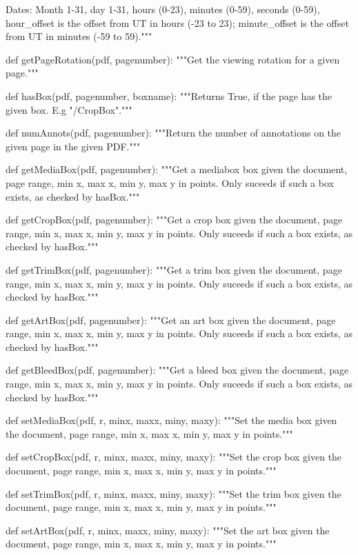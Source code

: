     Dates: Month 1-31, day 1-31, hours (0-23), minutes (0-59), seconds (0-59),
    hour_offset is the offset from UT in hours (-23 to 23); minute_offset is
    the offset from UT in minutes (-59 to 59)."""

def getPageRotation(pdf, pagenumber):
    """Get the viewing rotation for a given page."""

def hasBox(pdf, pagenumber, boxname):
    """Returns True, if the page has the given box. E.g "/CropBox"."""

def numAnnots(pdf, pagenumber):
    """Return the number of annotations on the given page in the given PDF."""

def getMediaBox(pdf, pagenumber):
    """Get a mediabox box given the document, page range, min x, max x, min y,
    max y in points. Only suceeds if such a box exists, as checked by
    hasBox."""

def getCropBox(pdf, pagenumber):
    """Get a crop box given the document, page range, min x, max x, min y, max
    y in points. Only suceeds if such a box exists, as checked by hasBox."""

def getTrimBox(pdf, pagenumber):
    """Get a trim box given the document, page range, min x, max x, min y, max
    y in points. Only suceeds if such a box exists, as checked by hasBox."""

def getArtBox(pdf, pagenumber):
    """Get an art box given the document, page range, min x, max x, min y, max
    y in points. Only suceeds if such a box exists, as checked by hasBox."""

def getBleedBox(pdf, pagenumber):
    """Get a bleed box given the document, page range, min x, max x, min y, max
    y in points. Only suceeds if such a box exists, as checked by hasBox."""

def setMediaBox(pdf, r, minx, maxx, miny, maxy):
    """Set the media box given the document, page range, min x, max x, min y,
    max y in points."""

def setCropBox(pdf, r, minx, maxx, miny, maxy):
    """Set the crop box given the document, page range, min x, max x, min y,
    max y in points."""

def setTrimBox(pdf, r, minx, maxx, miny, maxy):
    """Set the trim box given the document, page range, min x, max x, min y,
    max y in points."""

def setArtBox(pdf, r, minx, maxx, miny, maxy):
    """Set the art box given the document, page range, min x, max x, min y, max
    y in points."""

